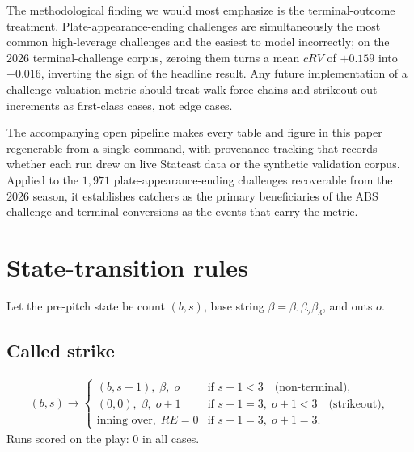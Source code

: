 The methodological finding we would most emphasize is the terminal-outcome
treatment. Plate-appearance-ending challenges are simultaneously the most
common high-leverage challenges and the easiest to model incorrectly; on the
2026 terminal-challenge corpus, zeroing them turns a mean $cRV$ of $+0.159$ into $-0.016$,
inverting the sign of the headline result. Any future implementation of a
challenge-valuation metric should treat walk force chains and strikeout out
increments as first-class cases, not edge cases.

The accompanying open pipeline makes every table and figure in this paper
regenerable from a single command, with provenance tracking that records
whether each run drew on live Statcast data or the synthetic validation corpus.
Applied to the $1{,}971$ plate-appearance-ending challenges recoverable from
the 2026 season, it establishes catchers as the
primary beneficiaries of the ABS challenge and terminal conversions as the
events that carry the metric.

\appendix
\section{State-transition rules}
\label{app:transitions}

Let the pre-pitch state be count $(b, s)$, base string
$\beta = \beta_1\beta_2\beta_3$, and outs $o$.

\subsection{Called strike}
\begin{align}
(b, s) \to
\begin{cases}
(b, s+1), \; \beta, \; o & \text{if } s + 1 < 3 \quad \text{(non-terminal)},\\
(0,0), \; \beta, \; o+1 & \text{if } s + 1 = 3, \; o + 1 < 3
  \quad \text{(strikeout)},\\
\text{inning over}, \; RE = 0 & \text{if } s + 1 = 3, \; o + 1 = 3.
\end{cases}
\end{align}
Runs scored on the play: $0$ in all cases.

